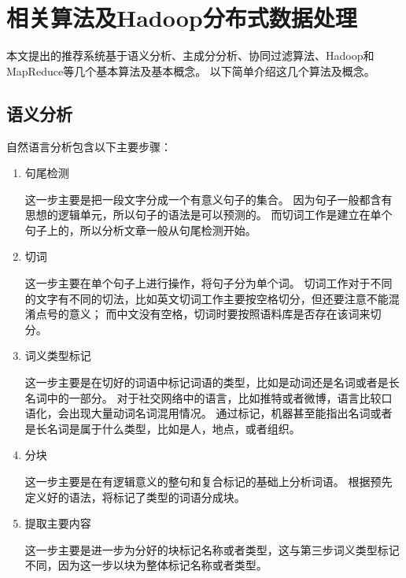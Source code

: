 \chapter{相关算法及Hadoop分布式数据处理}
本文提出的推荐系统基于语义分析、主成分分析、协同过滤算法、Hadoop和MapReduce等几个基本算法及基本概念。
以下简单介绍这几个算法及概念。
\section{语义分析}
自然语言分析包含以下主要步骤：
\begin{enumerate}
	\item 句尾检测

	这一步主要是把一段文字分成一个有意义句子的集合\parencite{kiss2006unsupervised}。
	因为句子一般都含有思想的逻辑单元，所以句子的语法是可以预测的。
	而切词工作是建立在单个句子上的，所以分析文章一般从句尾检测开始。
	
	\item 切词
	
	这一步主要在单个句子上进行操作，将句子分为单个词。
	切词工作对于不同的文字有不同的切法，比如英文切词工作主要按空格切分，但还要注意不能混淆点号的意义；
	而中文没有空格，切词时要按照语料库是否存在该词来切分。

	\item 词义类型标记

	这一步主要是在切好的词语中标记词语的类型，比如是动词还是名词或者是长名词中的一部分。
	对于社交网络中的语言，比如推特或者微博，语言比较口语化，会出现大量动词名词混用情况\parencite{Gimpel2011Part,Owoputi2015Improved,Derczynski2013Twitter}。
	通过标记，机器甚至能指出名词或者是长名词是属于什么类型，比如是人，地点，或者组织。
	
	\item 分块
	
	这一步主要是在有逻辑意义的整句和复合标记的基础上分析词语。
	根据预先定义好的语法，将标记了类型的词语分成块。

	\item 提取主要内容

	这一步主要是进一步为分好的块标记名称或者类型，这与第三步词义类型标记不同，因为这一步以块为整体标记名称或者类型。
\end{enumerate}

